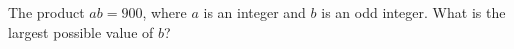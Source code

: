 The product $ab=900$, where $a$ is an integer and $b$ is an odd integer. What is the largest possible value of $b$?
